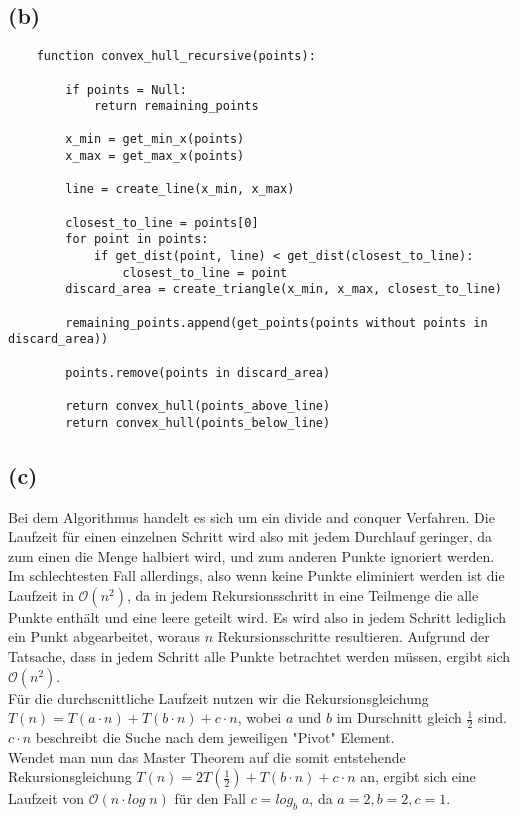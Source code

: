 \documentclass[a4paper]{scrartcl}
\begin{document}
\subsection*{(b)}
\begin{lstlisting}
	function convex_hull_recursive(points):
		
		if points = Null:
			return remaining_points
			
		x_min = get_min_x(points)
		x_max = get_max_x(points)
		
		line = create_line(x_min, x_max)
		
		closest_to_line = points[0]
		for point in points:
			if get_dist(point, line) < get_dist(closest_to_line):
				closest_to_line = point
		discard_area = create_triangle(x_min, x_max, closest_to_line)
		
		remaining_points.append(get_points(points without points in discard_area))
		
		points.remove(points in discard_area)
		
		return convex_hull(points_above_line)
		return convex_hull(points_below_line)
\end{lstlisting}


\subsection*{(c)}
Bei dem Algorithmus handelt es sich um ein divide and conquer Verfahren. Die Laufzeit für einen einzelnen Schritt wird also mit jedem Durchlauf geringer, da zum einen die Menge halbiert wird, und zum anderen Punkte ignoriert werden.\\
Im schlechtesten Fall allerdings, also wenn keine Punkte eliminiert werden ist die Laufzeit in $\mathcal{O}(n^2)$, da in jedem Rekursionsschritt in eine Teilmenge die alle Punkte enthält und eine leere geteilt wird.
Es wird also in jedem Schritt lediglich ein Punkt abgearbeitet, woraus $n$ Rekursionsschritte resultieren. Aufgrund der Tatsache, dass in jedem Schritt alle Punkte betrachtet werden müssen, ergibt sich $\mathcal{O}(n^2)$.\\
Für die durchscnittliche Laufzeit nutzen wir die Rekursionsgleichung $T(n) = T(a \cdot n) + T(b \cdot n) + c \cdot n$, wobei $a$ und $b$ im Durschnitt gleich $\frac{1}{2}$ sind. $c \cdot n$ beschreibt die Suche nach dem jeweiligen "Pivot" Element. \\
Wendet man nun das Master Theorem auf die somit entstehende  Rekursionsgleichung $T(n) = 2T(\frac{1}{2}) + T(b \cdot n) + c \cdot n$ an, ergibt sich eine Laufzeit von $\mathcal{O}(n \cdot log\;n)$ für den Fall $c = log_b\;a$, da $a = 2, b=2, c = 1$.
\end{document}

